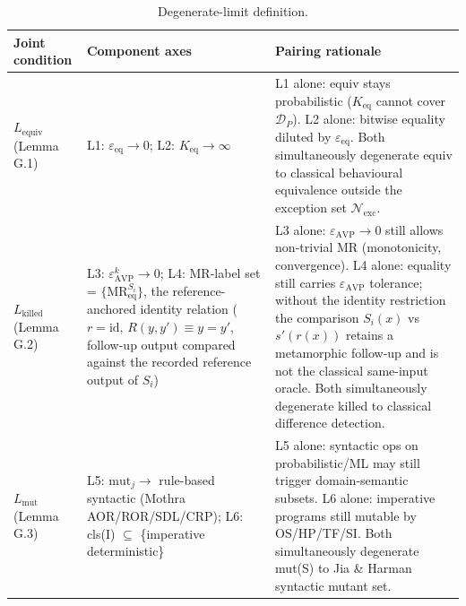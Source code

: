 \documentclass[manuscript,screen,review]{acmart}
\begin{document}
{%
\begin{longtable}[]{@{}
  >{\raggedright\arraybackslash}p{}
  >{\raggedright\arraybackslash}p{}
  >{\raggedright\arraybackslash}p{}@{}}
\caption{Degenerate-limit definition.}\label{tab:p2-29}\\
\toprule\noalign{}
\begin{minipage}[b]{\linewidth}\raggedright
Joint condition
\end{minipage} & \begin{minipage}[b]{\linewidth}\raggedright
Component axes
\end{minipage} & \begin{minipage}[b]{\linewidth}\raggedright
Pairing rationale
\end{minipage} \\
\midrule\noalign{}
\endfirsthead
\endhead
\bottomrule\noalign{}
\endlastfoot
\textbf{$L_{\mathrm{equiv}}$} (Lemma G.1) & L1: $\varepsilon_{\mathrm{eq}} \to 0$; L2: $K_{\mathrm{eq}} \to \infty$ & L1 alone:
equiv stays probabilistic ($K_{\mathrm{eq}}$ cannot cover $\mathcal{D}_P$). L2 alone: bitwise
equality diluted by $\varepsilon_{\mathrm{eq}}$. Both simultaneously degenerate equiv to
classical behavioural equivalence outside the exception set
$\mathcal{N}_{\mathrm{exc}}$. \\
\textbf{$L_{\mathrm{killed}}$} (Lemma G.2) & L3: $\varepsilon_{\mathrm{AVP}}^k \to 0$; L4: MR-label set =
$\{\mathrm{MR}_{\mathrm{eq}}^{S_i}\}$, the reference-anchored identity
relation ($r = \mathrm{id}$, $R(y,y') \equiv y = y'$, follow-up output
compared against the recorded reference output of $S_i$) & L3 alone: $\varepsilon_{\mathrm{AVP}} \to 0$ still allows
non-trivial MR (monotonicity, convergence). L4 alone: equality still
carries $\varepsilon_{\mathrm{AVP}}$ tolerance; without the identity
restriction the comparison $S_i(x)$ vs $s'(r(x))$ retains a metamorphic
follow-up and is not the classical same-input oracle. Both simultaneously degenerate killed to
classical difference detection. \\
\textbf{$L_{\mathrm{mut}}$} (Lemma G.3) & L5: $\mathrm{mut}_j \to$ rule-based syntactic (Mothra
AOR/ROR/SDL/CRP); L6: cls(I) $\subseteq$ \{imperative deterministic\} & L5 alone:
syntactic ops on probabilistic/ML may still trigger domain-semantic
subsets. L6 alone: imperative programs still mutable by OS/HP/TF/SI.
Both simultaneously degenerate mut(S) to Jia \& Harman syntactic mutant
set. \\
\end{longtable}
}
\end{document}
